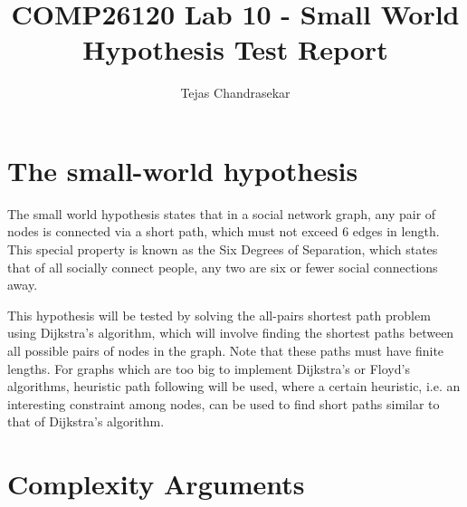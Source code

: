 \documentclass{article}
\title{COMP26120 Lab 10 - Small World Hypothesis Test Report}
\author{Tejas Chandrasekar}
\begin{document}
\maketitle
\newpage 


\section{The small-world hypothesis}
\label{sec:small world}

The small world hypothesis states that in a social network graph, any pair of
nodes is connected via a short path, which must not exceed 6 edges in length. This special
property is known as the Six Degrees of Separation, which states that of all socially
connect people, any two are six or fewer social connections away. \par

\noindent This hypothesis will be tested by solving the all-pairs shortest path
problem using Dijkstra's algorithm, which will involve finding the shortest
paths between all possible pairs of nodes in the graph. Note that these paths
must have finite lengths. For graphs which are too big to implement Dijkstra's
or Floyd's algorithms, heuristic path following will be used, where a certain
heuristic, i.e. an interesting constraint among nodes, can be used to find
short paths similar to that of Dijkstra's algorithm.

\section{Complexity Arguments}
\label{sec:complexity}
\end{document}
